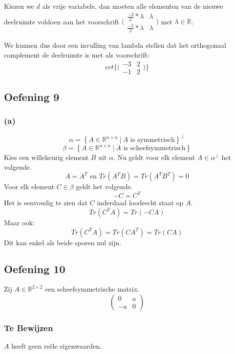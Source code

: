 \documentclass[lineaire_algebra_oplossingen.tex]{subfiles}
\begin{document}
Kiezen we $d$ als vrije variabele, dan moeten alle elementen van de nieuwe deelruimte voldoen aan het voorschrift $\bigl(\begin{smallmatrix}
\frac{-3}{2}*\lambda & \lambda \\
\frac{-1}{2}*\lambda & \lambda
\end{smallmatrix}\bigr)$ met $\lambda \in \mathbb{R}$.

We kunnen dus door een invulling van lambda stellen dat het orthogonaal complement de deelruimte is met als voorschrift:
\[
vct\{\bigl(\begin{smallmatrix}
-3 & 2 \\
-1 & 2
\end{smallmatrix}\bigr)\}
\]

\subsection{Oefening 9}
\subsubsection*{(a)}
\[
\alpha=
\left\{
A \in \mathbb{R}^{n\times n}\ |\ A \text{ is symmetrisch}
\right\}^\bot
\]
\[
\beta=
\left\{
A \in \mathbb{R}^{n\times n}\ |\ A \text{ is scheefsymmetrisch}
\right\}
\]
Kies een willekeurig element $B$ uit $\alpha$. Nu geldt voor elk element $A\in\alpha^\bot$ het volgende.
\[
A=A^T\text{ en } Tr(A^TB) = Tr(A^TB^T)= 0
\]
Voor elk element $C \in \beta$ geldt het volgende.
\[
-C = C^T
\]
Het is eenvoudig te zien dat $C$ inderdaad loodrecht staat op $A$.
\[
Tr(C^TA) = Tr(-CA)
\]
Maar ook:
\[
Tr(C^TA) = Tr(CA^T) = Tr(CA)
\]
Dit kan enkel als beide sporen nul zijn.



\subsection{Oefening 10}
Zij $A \in \mathbb{R}^{2\times 2}$ een scheefsymmetrische matrix.
\[
\begin{pmatrix}
0 & a\\
-a & 0
\end{pmatrix}
\]

\subsubsection*{Te Bewijzen}
$A$ heeft geen re\"ele eigenwaarden.
\end{document}
